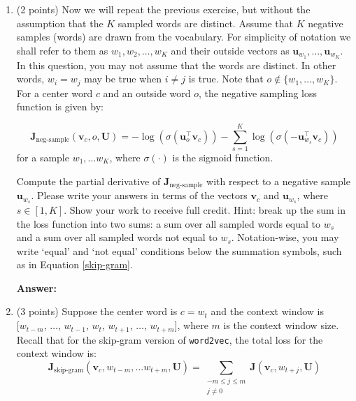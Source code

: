 \documentclass{article}
\newenvironment{answer}{
    {\bf Answer:} \sf \begingroup\color{red}
}{\endgroup}%
\begin{document}
\begin{enumerate}[label=(\alph*)]
\item (2 points) Now we will repeat the previous exercise, but without the assumption that the $K$ sampled words are distinct.  Assume that $K$ negative samples (words) are drawn from the vocabulary. For simplicity of notation we shall refer to them as $w_1, w_2, \dots, w_K$ and their outside vectors as $\bm u_{w_1}, \dots, \bm u_{w_K}$. In this question, you may not assume that the words are distinct. In other words, $w_i=w_j$ may be true when $i\neq j$ is true.
Note that $o\notin\{w_1, \dots, w_K\}$. 
For a center word $c$ and an outside word $o$, the negative sampling loss function is given by:

\begin{equation}
\bm J_{\text{neg-sample}}(\bm v_c, o, \bm U) = -\log(\sigma(\bm u_o^\top \bm v_c)) - \sum_{s=1}^K \log(\sigma(-\bm u_{w_s}^\top \bm v_c))
\end{equation}
for a sample $w_1, \ldots w_K$, where $\sigma(\cdot)$ is the sigmoid function.

Compute the partial derivative of $\bm J_{\text{neg-sample}}$ with respect to a negative sample $\bm u_{w_s}$. Please write your answers in terms of the vectors $\bm v_c$ and $\bm u_{w_s}$, where $s \in [1, K]$. Show your work to receive full credit. Hint: break up the sum in the loss function into two sums: a sum over all sampled words equal to $w_s$ and a sum over all sampled words not equal to $w_s$. Notation-wise, you may write `equal' and `not equal' conditions below the summation symbols, such as in Equation \ref{skip-gram}.

\begin{shaded}
\begin{answer}

\end{answer}
\end{shaded}

\item (3 points) Suppose the center word is $c = w_t$ and the context window is $[w_{t-m}$, $\ldots$, $w_{t-1}$, $w_{t}$, $w_{t+1}$, $\ldots$, $w_{t+m}]$, where $m$ is the context window size. Recall that for the  skip-gram version of {\tt word2vec}, the total loss for the context window is:
\begin{equation}
\label{skip-gram}
\bm J_{\textrm{skip-gram}}(\bm v_c, w_{t-m},\ldots w_{t+m}, \bm U) = \sum_{\substack{-m\le j \le m \\ j\ne 0}} \bm J(\bm v_c, w_{t+j}, \bm U)
\end{equation}


\end{enumerate}
\end{document}
